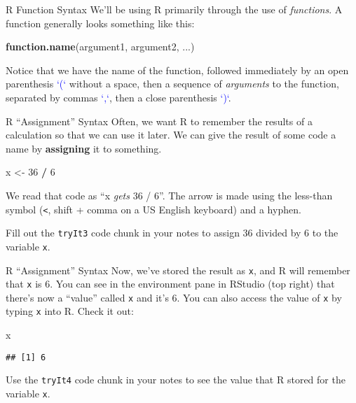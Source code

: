 \documentclass[
  ignorenonframetext,
]{beamer}
\newenvironment{Shaded}{\begin{snugshade}}{\end{snugshade}}
\newcommand{\DecValTok}[1]{\textcolor[rgb]{0.00,0.00,0.81}{#1}}
\newcommand{\FunctionTok}[1]{\textcolor[rgb]{0.13,0.29,0.53}{\textbf{#1}}}
\newcommand{\NormalTok}[1]{#1}
\newcommand{\OtherTok}[1]{\textcolor[rgb]{0.56,0.35,0.01}{#1}}
\newcommand{\SpecialCharTok}[1]{\textcolor[rgb]{0.81,0.36,0.00}{\textbf{#1}}}
\begin{document}
\begin{frame}[fragile]{R Function Syntax}
\label{r-function-syntax}
We'll be using R primarily through the use of \emph{functions}. A
function generally looks something like this:

\begin{Shaded}
\begin{Highlighting}[]
\FunctionTok{function.name}\NormalTok{(argument1, argument2, ...)}
\end{Highlighting}
\end{Shaded}

Notice that we have the name of the function, followed immediately by an
open parenthesis \textcolor{blue}{`(`} without a space, then a sequence
of \emph{arguments} to the function, separated by commas
\textcolor{blue}{`,`}, then a close parenthesis \textcolor{blue}{`)`}.
\end{frame}

\begin{frame}[fragile]{R ``Assignment'' Syntax}
\label{r-assignment-syntax}
Often, we want R to remember the results of a calculation so that we can
use it later. We can give the result of some code a name by
\textbf{assigning} it to something.

\begin{Shaded}
\begin{Highlighting}[]
\NormalTok{x }\OtherTok{\textless{}{-}} \DecValTok{36} \SpecialCharTok{/} \DecValTok{6}
\end{Highlighting}
\end{Shaded}

We read that code as ``x \emph{gets} 36 / 6''. The arrow is made using
the less-than symbol (\texttt{\textless{}}, shift + comma on a US
English keyboard) and a hyphen.

Fill out the \texttt{tryIt3} code chunk in your notes to assign 36
divided by 6 to the variable \texttt{x}.
\end{frame}

\begin{frame}[fragile]{R ``Assignment'' Syntax}
\label{r-assignment-syntax-1}
Now, we've stored the result as \texttt{x}, and R will remember that
\texttt{x} is 6. You can see in the environment pane in RStudio (top
right) that there's now a ``value'' called \texttt{x} and it's 6. You
can also access the value of \texttt{x} by typing \texttt{x} into R.
Check it out:

\begin{Shaded}
\begin{Highlighting}[]
\NormalTok{x}
\end{Highlighting}
\end{Shaded}

\begin{verbatim}
## [1] 6
\end{verbatim}

Use the \texttt{tryIt4} code chunk in your notes to see the value that R
stored for the variable \texttt{x}.
\end{frame}
\end{document}

